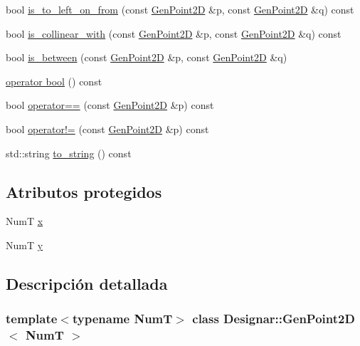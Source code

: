 \begin{DoxyCompactItemize}
\item 
bool \hyperlink{class_designar_1_1_gen_point2_d_af23c6b5033a1e261288d0ba9185f2d53}{is\+\_\+to\+\_\+left\+\_\+on\+\_\+from} (const \hyperlink{class_designar_1_1_gen_point2_d}{Gen\+Point2D} \&p, const \hyperlink{class_designar_1_1_gen_point2_d}{Gen\+Point2D} \&q) const
\item 
bool \hyperlink{class_designar_1_1_gen_point2_d_a5ffe32dc4a322ba54d2bcc0d4b2a04e6}{is\+\_\+collinear\+\_\+with} (const \hyperlink{class_designar_1_1_gen_point2_d}{Gen\+Point2D} \&p, const \hyperlink{class_designar_1_1_gen_point2_d}{Gen\+Point2D} \&q) const
\item 
bool \hyperlink{class_designar_1_1_gen_point2_d_ad08c66d5213123e3c3e804d1fbeedee3}{is\+\_\+between} (const \hyperlink{class_designar_1_1_gen_point2_d}{Gen\+Point2D} \&p, const \hyperlink{class_designar_1_1_gen_point2_d}{Gen\+Point2D} \&q)
\item 
\hyperlink{class_designar_1_1_gen_point2_d_a9f54b6e39d8ea1b2eb2fdab5ce548c9f}{operator bool} () const
\item 
bool \hyperlink{class_designar_1_1_gen_point2_d_a747d02a58ebf0cc451de6075650f6596}{operator==} (const \hyperlink{class_designar_1_1_gen_point2_d}{Gen\+Point2D} \&p) const
\item 
bool \hyperlink{class_designar_1_1_gen_point2_d_af8feb3aa4f9bd38166ef9ea16018d4f4}{operator!=} (const \hyperlink{class_designar_1_1_gen_point2_d}{Gen\+Point2D} \&p) const
\item 
std\+::string \hyperlink{class_designar_1_1_gen_point2_d_ab526fff4fe942d9b5a7e71d48ad50168}{to\+\_\+string} () const
\end{DoxyCompactItemize}
\subsection*{Atributos protegidos}
\begin{DoxyCompactItemize}
\item 
NumT \hyperlink{class_designar_1_1_gen_point2_d_a1ffcc660a16a77dc488bb69525cc99de}{x}
\item 
NumT \hyperlink{class_designar_1_1_gen_point2_d_a89aada53ecce4e14878c1a97843ed2d2}{y}
\end{DoxyCompactItemize}


\subsection{Descripción detallada}
\subsubsection*{template$<$typename NumT$>$\newline
class Designar\+::\+Gen\+Point2\+D$<$ Num\+T $>$}



